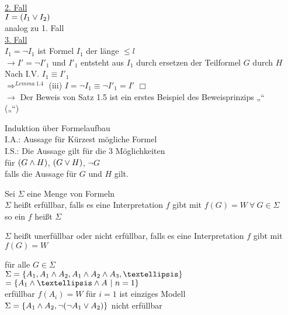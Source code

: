 \noindent
\underline{2. Fall}\\
$I = (I_1 \vee I_2)$\\
analog zu 1. Fall\\

\noindent
\underline{3. Fall}\\
$I_1 = \neg I_1$ ist Formel $I_1$ der länge $\leq l$\\
$\rightarrow I' = \neg I'_1$ und $I'_1$ entsteht aus $I_1$ durch ersetzen der Teilformel $G$ durch $H$\\

\noindent
Nach I.V. \hspace{1cm} $I_1 \equiv I'_1$\\
$\Rightarrow^{Lemma\ 1.4}$ (iii) $I = \neg I_1 \equiv \neg I'_1 = I'$ $\Box$\\
$\rightarrow$ Der Beweis von Satz 1.5 ist ein erstes Beispiel des Beweisprinzips „“\\
(„“)


\beweis{}
Induktion über Formelaufbau\\
I.A.: Aussage für Kürzest mögliche Formel\\
I.S.: Die Aussage gilt für die 3 Möglichkeiten\\
für $(G \wedge H)$, $(G \vee H)$, $\neg G$\\
falls die Aussage für $G$ und $H$ gilt.

Sei $\Sigma$ eine Menge von Formeln\\
$\Sigma$ heißt erfüllbar, falls es eine Interpretation $f$ gibt mit $f(G) = W\ \forall\ G \in \Sigma$\\
so ein $f$ heißt  $\Sigma$

\noindent
$\Sigma$ heißt unerfüllbar oder nicht erfüllbar, falls es eine Interpretation $f$ gibt mit $f(G) = W$

\noindent
für alle $G \in \Sigma$\\

\beispiel{}
$\Sigma = \{A_1, A_1 \AND A_2, A_1 \AND A_2 \AND A_3, … \}$\\
$= \{A_1 \AND … \AND A \ |\ n=1 \}$\\

\noindent
erfüllbar $f(A_i) = W$ für $i=1$ ist einziges Modell\\
$\Sigma = \{A_1 \wedge A_2, \neg ( \neg A_1 \vee A_2) \}$ nicht erfüllbar\\

